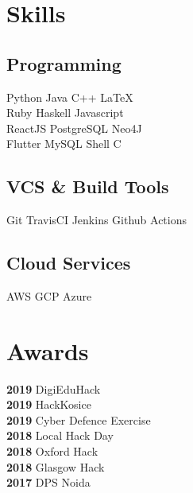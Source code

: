 \documentclass[]{deedy-resume-openfont}
\begin{document}
\begin{minipage}[t]{0.66\textwidth}
%
%


\end{minipage}%
\hfill
\begin{minipage}[t]{0.33\textwidth} 


\section{Skills}
\subsection{Programming}
Python \textbullet{} Java \textbullet{} C++ \textbullet{} \LaTeX\ \\ 
Ruby \textbullet{} Haskell \textbullet{} Javascript \\
ReactJS \textbullet{} PostgreSQL \textbullet{} Neo4J \\
Flutter \textbullet{} MySQL \textbullet{} Shell \textbullet{} C
\subsection{VCS \& Build Tools}
Git \textbullet{} TravisCI \textbullet{}Jenkins \textbullet{} Github Actions
\subsection{Cloud Services}
AWS \textbullet{} GCP \textbullet{} Azure
\sectionsep


\section{Awards} 

\textbf{2019 } DigiEduHack \\
\textbf{2019 } HackKosice \\
\textbf{2019 } Cyber Defence Exercise\\
\textbf{2018 } Local Hack Day\\
\textbf{2018 } Oxford Hack \\
\textbf{2018 } Glasgow Hack \\
\textbf{2017 } DPS Noida


\end{minipage}
\end{document}
